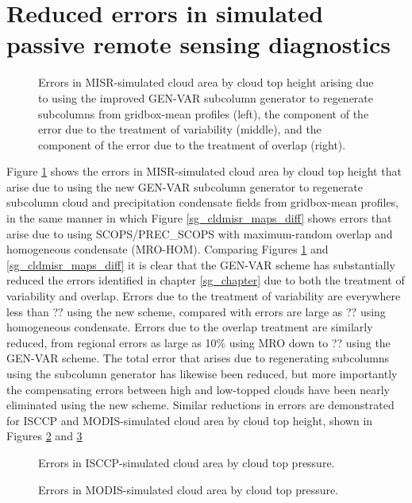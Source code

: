 \section{Reduced errors in simulated passive remote sensing diagnostics}
\begin{figure}
\centering
\caption{Errors in MISR-simulated cloud area by cloud top height arising due to using the improved GEN-VAR subcolumn generator to regenerate subcolumns from gridbox-mean profiles (left), the component of the error due to the treatment of variability (middle), and the component of the error due to the treatment of overlap (right).}
\label{sgi_cldmisr_maps_diff}
\end{figure}
Figure \ref{sgi_cldmisr_maps_diff} shows the errors in MISR-simulated cloud area by cloud top height that arise due to using the new GEN-VAR subcolumn generator to regenerate subcolumn cloud and precipitation condensate fields from gridbox-mean profiles, in the same manner in which Figure \ref{sg_cldmisr_maps_diff} shows errors that arise due to using SCOPS/PREC\_SCOPS with maximum-random overlap and homogeneous condensate (MRO-HOM). Comparing Figures \ref{sgi_cldmisr_maps_diff} and \ref{sg_cldmisr_maps_diff} it is clear that the GEN-VAR scheme has substantially reduced the errors identified in chapter \ref{sg_chapter} due to both the treatment of variability and overlap. Errors due to the treatment of variability are everywhere less than ?? using the new scheme, compared with errors are large as ?? using homogeneous condensate. Errors due to the overlap treatment are similarly reduced, from regional errors as large as 10\% using MRO down to ?? using the GEN-VAR scheme. The total error that arises due to regenerating subcolumns using the subcolumn generator has likewise been reduced, but more importantly the compensating errors between high and low-topped clouds have been nearly eliminated using the new scheme. Similar reductions in errors are demonstrated for ISCCP and MODIS-simulated cloud area by cloud top height, shown in Figures \ref{sgi_cldisccp_maps_diff} and \ref{sgi_cldmodis_maps_diff}

\begin{figure}
\centering
\caption{Errors in ISCCP-simulated cloud area by cloud top pressure.}
\label{sgi_cldisccp_maps_diff}
\end{figure}

\begin{figure}
\centering
\caption{Errors in MODIS-simulated cloud area by cloud top pressure.}
\label{sgi_cldmodis_maps_diff}
\end{figure}

